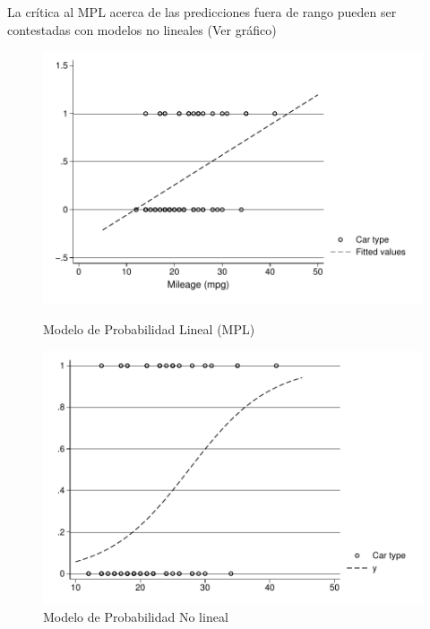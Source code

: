 \begin{frame}
	La crítica al MPL acerca de las predicciones fuera de
	rango pueden ser contestadas con modelos no lineales (Ver gráfico)
	
	\begin{figure}[H]
		\centering
		\begin{minipage}{.48\linewidth}
			\includegraphics[width=\linewidth]{fig/mpl}
			\caption{Modelo de Probabilidad Lineal (MPL)}
			\label{img1}
		\end{minipage}
		\hfill
		\begin{minipage}{.48\linewidth}
			\includegraphics[width=\linewidth]{fig/mpnl}
			\caption{Modelo de Probabilidad No lineal}
			\label{img2}
		\end{minipage}
	\end{figure}
	
\end{frame}

